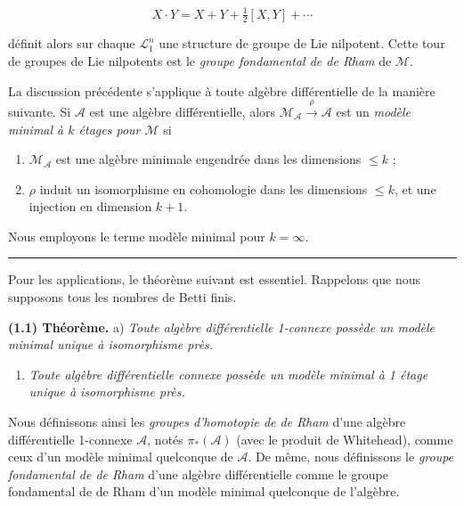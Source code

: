 \documentclass[
  french,
  a3paper,
  a3paper]{extarticle}
\providecommand{\tightlist}{%
  \setlength{\itemsep}{0pt}\setlength{\parskip}{0pt}}
\begin{document}
\[
X\cdot Y=X+Y+\tfrac12[X,Y]+\cdots
\]

définit alors sur chaque \(\mathcal L_1^n\) une structure de groupe de
Lie nilpotent. Cette tour de groupes de Lie nilpotents est le
\emph{groupe fondamental de de Rham} de \(\mathcal M\).

La discussion précédente s'applique à toute algèbre différentielle de la
manière suivante. Si \(\mathscr A\) est une algèbre différentielle,
alors \(\mathcal M_{\mathscr A}\xrightarrow{\rho}\mathscr A\) est un
\emph{modèle minimal à \(k\) étages pour \(\mathcal M\)} si

\begin{enumerate}
\def\labelenumi{\arabic{enumi})}
\item
  \(\mathcal M_{\mathscr A}\) est une algèbre minimale engendrée dans
  les dimensions \(\le k\) ;
\item
  \(\rho\) induit un isomorphisme en cohomologie dans les dimensions
  \(\le k\), et une injection en dimension \(k+1\).
\end{enumerate}

Nous employons le terme modèle minimal pour \(k=\infty\).

\clearpage



\par

\vspace{0.7mm}\hrule\vspace{1.6mm}

\fontsize{9}{11}\selectfont

Pour les applications, le théorème suivant est essentiel. Rappelons que
nous supposons tous les nombres de Betti finis.

\textbf{(1.1) Théorème.} a) \emph{Toute algèbre différentielle 1-connexe
possède un modèle minimal unique à isomorphisme près.}

\begin{enumerate}
\def\labelenumi{\alph{enumi})}
\setcounter{enumi}{1}
\tightlist
\item
  \emph{Toute algèbre différentielle connexe possède un modèle minimal à
  1 étage unique à isomorphisme près.}
\end{enumerate}

Nous définissons ainsi les \emph{groupes d'homotopie de de Rham} d'une
algèbre différentielle 1-connexe \(\mathscr A\), notés
\(\pi_*(\mathscr A)\) (avec le produit de Whitehead), comme ceux d'un
modèle minimal quelconque de \(\mathscr A\). De même, nous définissons
le \emph{groupe fondamental de de Rham} d'une algèbre différentielle
comme le groupe fondamental de de Rham d'un modèle minimal quelconque de
l'algèbre.
\end{document}
